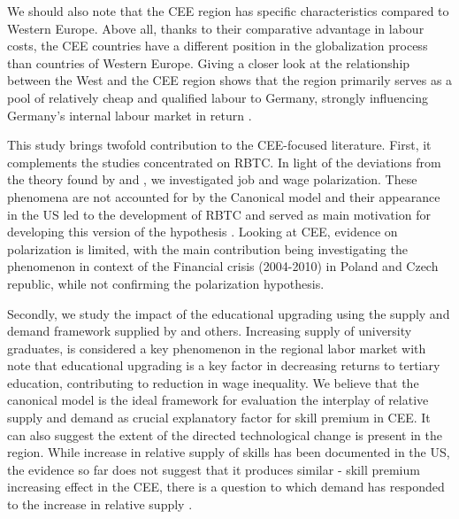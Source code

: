 \documentclass[11pt]{article}
\begin{document}
We should also note that the CEE region has specific characteristics compared to Western Europe. Above all, thanks to their comparative advantage in labour costs, the CEE countries have a different position in the globalization process than countries of Western Europe. Giving a closer look at the relationship between the West and the CEE region shows that the region primarily serves as a pool of relatively cheap and qualified labour to Germany, strongly influencing Germany's internal labour market in return 
\citep{marin2004nation, marin2018global}. 

This study brings twofold contribution to the CEE-focused literature. First, it complements the studies concentrated on RBTC. In light of the deviations from the theory found by \citet{arendt2019technical} and \citet{hardy2018educational}, we investigated job and wage polarization. These phenomena are not accounted for by the Canonical model and their appearance in the US led to the development of RBTC and served as main motivation for developing this version of the hypothesis \citep{acemoglu2011skills}. Looking at CEE, evidence on polarization is limited, with the main contribution being \cite{mysikova2018personal} investigating the phenomenon in context of the Financial crisis (2004-2010) in Poland and Czech republic, while not confirming the polarization hypothesis.

Secondly, we study the impact of the educational upgrading using the supply and demand framework supplied by \cite{katz1992changes} and others.  Increasing supply of university graduates, is considered a key phenomenon in the regional labor market \citep{arendt2019technical, hardy2018educational} with \cite{magda2021firms} note that educational upgrading is a key factor in decreasing returns to tertiary education, contributing to reduction in wage inequality. We believe that the canonical model is the ideal framework for evaluation the interplay of relative supply and demand as crucial explanatory factor for skill premium in CEE. It can also suggest the extent of the directed technological change is present in the region. While increase in relative supply of skills has been documented in the US, the evidence so far does not suggest that it produces similar - skill premium increasing effect in the CEE, there is a question to which demand has responded to the increase in relative supply \cite{acemoglu2002directed}. 
\end{document}
